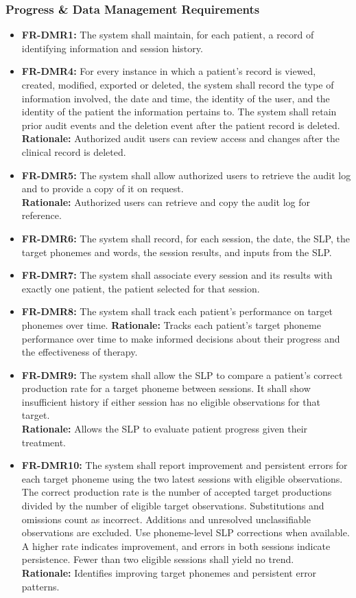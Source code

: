 \documentclass[12pt]{article}
\begin{document}
\subsubsection{Progress \& Data Management Requirements}
\begin {itemize}
\item \textbf{FR-DMR1:} The system shall maintain, for each patient, a record of identifying information and session history. 
\item \textbf{FR-DMR4:} For every instance in which a patient's record is viewed, created, modified, exported or deleted, the system shall record the type of information involved, the date and time, the identity of the user, and the identity of the patient the information pertains to. The system shall retain prior audit events and the deletion event after the patient record is deleted. \\
\textbf{Rationale:} Authorized audit users can review access and changes after the clinical record is deleted.
\item \textbf{FR-DMR5:} The system shall allow authorized users to retrieve the audit log and to provide a copy of it on request. \\
\textbf{Rationale:} Authorized users can retrieve and copy the audit log for reference.
\item \textbf{FR-DMR6:} The system shall record, for each session, the date, the SLP, the target phonemes and words, the session results, and inputs from the SLP. 
\item \textbf{FR-DMR7:} The system shall associate every session and its results with exactly one patient, the patient selected for that session.
\item \textbf{FR-DMR8:} The system shall track each patient's performance on target phonemes over time. 
\textbf{Rationale:} Tracks each patient's target phoneme performance over time to make informed decisions about their progress and the effectiveness of therapy.
\item \textbf{FR-DMR9:} The system shall allow the SLP to compare a patient's correct production rate for a target phoneme between sessions. It shall show insufficient history if either session has no eligible observations for that target. \\
\textbf{Rationale:} Allows the SLP to evaluate patient progress given their treatment.
\item \textbf{FR-DMR10:} The system shall report improvement and persistent errors for each target phoneme using the two latest sessions with eligible observations. The correct production rate is the number of accepted target productions divided by the number of eligible target observations. Substitutions and omissions count as incorrect. Additions and unresolved unclassifiable observations are excluded. Use phoneme-level SLP corrections when available. A higher rate indicates improvement, and errors in both sessions indicate persistence. Fewer than two eligible sessions shall yield no trend. \\
\textbf{Rationale:} Identifies improving target phonemes and persistent error patterns.
\end{itemize}
\end{document}
